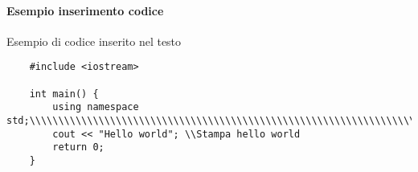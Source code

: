 \documentclass[12pt]{article} %
\begin{document}
\paragraph{Esempio inserimento codice}
	Esempio di codice inserito nel testo
	\begin{verbatim}
	#include <iostream>

	int main() {
		using namespace std;\\\\\\\\\\\\\\\\\\\\\\\\\\\\\\\\\\\\\\\\\\\\\\\\\\\\\\\\\\\\\\\\\\\\\\\\\\\\\\\\\\\\\\\\\\\\\\\\\\\\\
		cout << "Hello world"; \\Stampa hello world
		return 0;
	}
	\end{verbatim}
\end{document}

